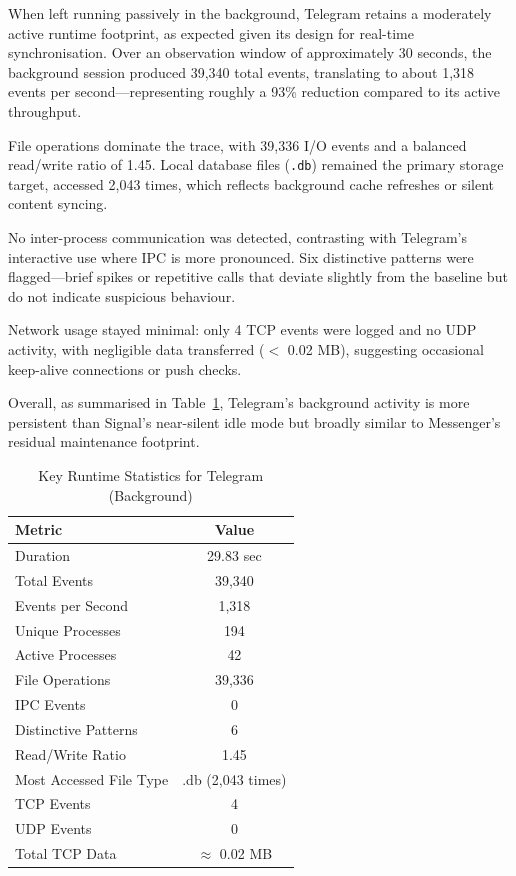 \documentclass[a4paper,12pt]{report}
\begin{document}
When left running passively in the background, Telegram retains a moderately active runtime footprint, as expected given its design for real-time synchronisation. Over an observation window of approximately 30 seconds, the background session produced 39,340 total events, translating to about 1,318 events per second—representing roughly a 93\% reduction compared to its active throughput.

File operations dominate the trace, with 39,336 I/O events and a balanced read/write ratio of 1.45. Local database files (\texttt{.db}) remained the primary storage target, accessed 2,043 times, which reflects background cache refreshes or silent content syncing.

No inter-process communication was detected, contrasting with Telegram’s interactive use where IPC is more pronounced. Six distinctive patterns were flagged—brief spikes or repetitive calls that deviate slightly from the baseline but do not indicate suspicious behaviour.

Network usage stayed minimal: only 4 TCP events were logged and no UDP activity, with negligible data transferred ($<$ 0.02 MB), suggesting occasional keep-alive connections or push checks.

Overall, as summarised in Table~\ref{tab:telegram_background_stats}, Telegram’s background activity is more persistent than Signal’s near-silent idle mode but broadly similar to Messenger’s residual maintenance footprint.

\begin{table}[H]
    \centering
    \caption{Key Runtime Statistics for Telegram (Background)}
    \label{tab:telegram_background_stats}
    \begin{tabular}{|l|c|}
        \hline
        \textbf{Metric} & \textbf{Value} \\
        \hline
        Duration & 29.83 sec \\
        Total Events & 39,340 \\
        Events per Second & 1,318 \\
        Unique Processes & 194 \\
        Active Processes & 42 \\
        File Operations & 39,336 \\
        IPC Events & 0 \\
        Distinctive Patterns & 6 \\
        Read/Write Ratio & 1.45 \\
        Most Accessed File Type & .db (2,043 times) \\
        TCP Events & 4 \\
        UDP Events & 0 \\
        Total TCP Data & $\approx$ 0.02 MB \\
        \hline
    \end{tabular}
\end{table}
\end{document}
